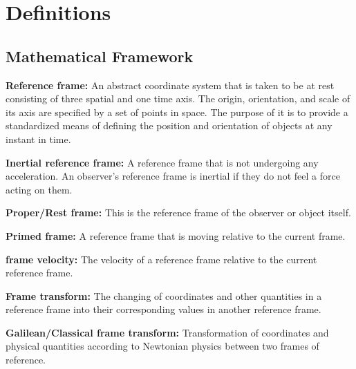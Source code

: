 
\section{Definitions}

\subsection{Mathematical Framework}%

\noindent \hypertarget{def-Reference-frame}{\textbf{Reference frame:}}
An abstract coordinate system that is taken to be at rest consisting of three spatial and one time axis. The origin, orientation, and scale of its axis are specified by a set of points in space. The purpose of it is to provide a standardized means of defining the position and orientation of objects at any instant in time.

\noindent \hypertarget{def-Inertial-reference-frame}{\textbf{Inertial reference frame:}}
A reference frame that is not undergoing any acceleration. An observer's reference frame is inertial if they do not feel a force acting on them.

\noindent \hypertarget{def-proper-frame}{\textbf{Proper/Rest frame:}}
This is the reference frame of the observer or object itself.


\noindent \hypertarget{def-Primed-Frame}{\textbf{Primed frame:}}
A reference frame that is moving relative to the current frame.

\noindent \hypertarget{def-frame-velocity}{\textbf{frame velocity:}}
The velocity of a reference frame relative to the current reference frame.

\noindent \hypertarget{def-transform}{\textbf{Frame transform:}}
The changing of coordinates and other quantities in a reference frame into their corresponding values in another reference frame.

\noindent \hypertarget{def-galilean-transform}{\textbf{Galilean/Classical frame transform:}}
Transformation of coordinates and physical quantities according to Newtonian physics between two frames of reference.

